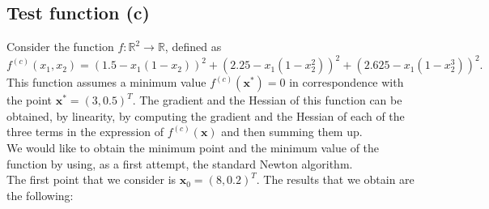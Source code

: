 \documentclass[a4paper,11pt]{article}
\begin{document}
	\subsection{Test function (c)}
	Consider the function $f:\mathbb{R}^{2} \rightarrow  \mathbb{R}$, defined as 
	\begin{equation}
		f^{(c)}(x_{1},x_{2}) = (1.5 - x_{1}(1-x_{2}))^2 + (2.25 - x_{1}(1-x_{2}^{2}))^2 + (2.625 - x_{1}(1-x_{2}^{3}))^2.
	\end{equation}
	This function assumes a minimum value $f^{(c)}(\textbf{x}^*)=0$ in correspondence with the point $\textbf{x}^* = (3,0.5)^{T}$. The gradient and the Hessian of this function can be obtained, by linearity, by computing the gradient and the Hessian of each of the three terms in the expression of $f^{(c)}(\textbf{x})$ and then summing them up.\\
	
	\noindent We would like to obtain the minimum point and the minimum value of the function by using, as a first attempt, the standard Newton algorithm.\\
	
	 
	\noindent The first point that we consider is $\textbf{x}_{0}=(8,0.2)^{T}$. The results that we obtain are the following:
	
\end{document}
